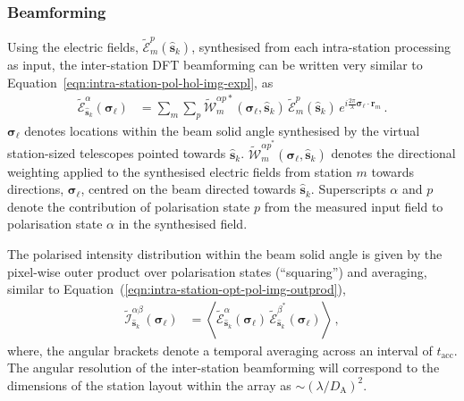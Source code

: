 \documentclass[
  journal=pasa,
  manuscript=article-type,
  year=2020,
  volume=37,
]{cup-journal}
\begin{document}
\subsubsection{Beamforming}

Using the electric fields, $\widetilde{\mathcal{E}}_m^p(\hat{\boldsymbol{s}}_k)$, synthesised from each intra-station processing as input, the inter-station DFT beamforming 
can be written very similar to Equation~\ref{eqn:intra-station-pol-hol-img-expl}, as
\begin{align}
    \widetilde{\mathcal{E}}_{\hat{\boldsymbol{s}}_k}^\alpha(\boldsymbol{\sigma}_\ell) &= \sum_{m} \sum_p  \widetilde{\mathcal{W}}_{m}^{\alpha p *}(\boldsymbol{\sigma}_\ell,\hat{\boldsymbol{s}}_k) \, \widetilde{\mathcal{E}}_m^p(\hat{\boldsymbol{s}}_k) \, e^{i\frac{2\pi}{\lambda} \boldsymbol{\sigma}_\ell\cdot\boldsymbol{r}_{m}} \, . \label{eqn:inter-station-pol-hol-img-expl}   
\end{align}
$\boldsymbol{\sigma}_\ell$ denotes locations within the beam solid angle synthesised by the virtual station-sized telescopes pointed towards $\hat{\boldsymbol{s}}_k$. $\widetilde{\mathcal{W}}_{m}^{{\alpha p}^*}(\boldsymbol{\sigma}_\ell,\hat{\boldsymbol{s}}_k)$ denotes the directional weighting applied to the synthesised electric fields from station $m$ towards directions, $\boldsymbol{\sigma}_\ell$, centred on the beam directed towards $\hat{\boldsymbol{s}}_k$. Superscripts $\alpha$ and $p$ denote the contribution of polarisation state $p$ from the measured input field to polarisation state $\alpha$ in the synthesised field.

The polarised intensity distribution within the beam solid angle
is given by the pixel-wise outer product over polarisation states (``squaring'') and averaging, similar to Equation~(\ref{eqn:intra-station-opt-pol-img-outprod}),
\begin{align}
    \widetilde{\mathcal{I}}^{\alpha\beta}_{\hat{\boldsymbol{s}}_k}(\boldsymbol{\sigma}_\ell) &= \left\langle \widetilde{\mathcal{E}}_{\hat{\boldsymbol{s}}_k}^\alpha(\boldsymbol{\sigma}_\ell) \,  \widetilde{\mathcal{E}}_{\hat{\boldsymbol{s}}_k}^{\beta^*}(\boldsymbol{\sigma}_\ell) \right\rangle \, , \label{eqn:inter-station-opt-pol-img-outprod}
\end{align}
where, the angular brackets denote a temporal averaging across an interval of $t_\textrm{acc}$. The angular resolution of the inter-station beamforming will correspond to the dimensions of the station layout within the array as $\sim (\lambda/D_\textrm{A})^2$.
\end{document}
